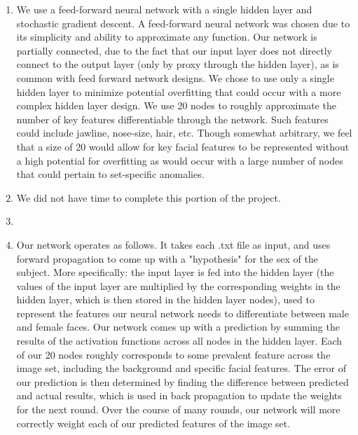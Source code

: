 \documentclass{article}
\title{ECS 170 - Programming Assignment #3}
\author{Aaron Allen / Sean Johnson}
\date{March 15, 2017}
\begin{document}
\maketitle

\begin{enumerate}
\item 
We use a feed-forward neural network with a single hidden layer and stochastic gradient descent. A feed-forward neural network was chosen due to its simplicity and ability to approximate any function. Our network is partially connected, due to the fact that our input layer does not directly connect to the output layer (only by proxy through the hidden layer), as is common with feed forward network designs. We chose to use only a single hidden layer to minimize potential overfitting that could occur with a more complex hidden layer design. We use 20 nodes to roughly approximate the number of key features differentiable through the network. Such features could include jawline, nose-size, hair, etc. Though somewhat arbitrary, we feel that a size of 20 would allow for key facial features to be represented without a high potential for overfitting as would occur with a large number of nodes that could pertain to set-specific anomalies.

\item

We did not have time to complete this portion of the project.

\item



\item
Our network operates as follows. It takes each .txt file as input, and uses forward propagation to come up with a "hypothesis" for the sex of the subject. More specifically: the input layer is fed into the hidden layer (the values of the input layer are multiplied by the corresponding weights in the hidden layer, which is then stored in the hidden layer nodes), used to represent the features our neural network needs to differentiate between male and female faces. Our network comes up with a prediction by summing the results of the activation functions across all nodes in the hidden layer. Each of our 20 nodes roughly corresponds to some prevalent feature across the image set, including the background and specific facial features. The error of our prediction is then determined by finding the difference between predicted and actual results, which is used in back propagation to update the weights for the next round. Over the course of many rounds, our network will more correctly weight each of our predicted features of the image set.

\end{enumerate}
\end{document}
